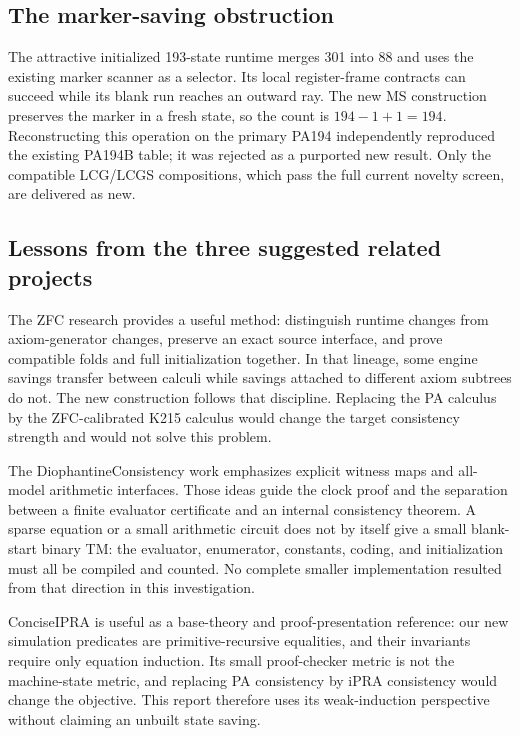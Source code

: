 \documentclass[11pt]{article}
\begin{document}
\subsection{The marker-saving obstruction}
The attractive initialized 193-state runtime merges 301 into 88 and
uses the existing marker scanner as a selector. Its local register-frame
contracts can succeed while its blank run reaches an outward ray.
The new MS construction preserves the marker in a fresh state, so the
count is $194-1+1=194$. Reconstructing this operation on the primary
PA194 independently reproduced the existing PA194B table; it was rejected
as a purported new result. Only the compatible LCG/LCGS compositions,
which pass the full current novelty screen, are delivered as new.





\subsection{Lessons from the three suggested related projects}
The ZFC research provides a useful method: distinguish runtime changes
from axiom-generator changes, preserve an exact source interface, and
prove compatible folds and full initialization together. In that lineage,
some engine savings transfer between calculi while savings attached to
different axiom subtrees do not. The new construction follows that
discipline. Replacing the PA calculus by the ZFC-calibrated K215 calculus
would change the target consistency strength and would not solve this
problem.

The DiophantineConsistency work emphasizes explicit witness maps and
all-model arithmetic interfaces. Those ideas guide the clock proof and
the separation between a finite evaluator certificate and an internal
consistency theorem. A sparse equation or a small arithmetic circuit
does not by itself give a small blank-start binary TM: the evaluator,
enumerator, constants, coding, and initialization must all be compiled
and counted. No complete smaller implementation resulted from that
direction in this investigation.

ConciseIPRA is useful as a base-theory and proof-presentation reference:
our new simulation predicates are primitive-recursive equalities, and
their invariants require only equation induction. Its small proof-checker
metric is not the machine-state metric, and replacing PA consistency by
iPRA consistency would change the objective. This report therefore uses
its weak-induction perspective without claiming an unbuilt state saving.
\end{document}
